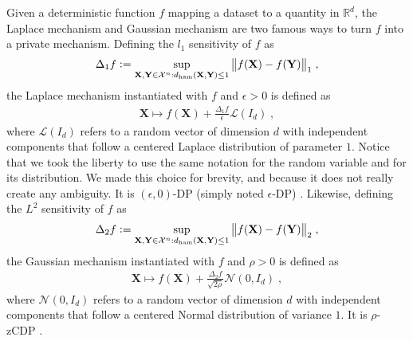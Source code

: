 \documentclass[10pt]{article} %
\newcommand{\R}[0]{\mathbb{R}}
\newcommand{\eqdef}{\vcentcolon=}
\newcommand\set[1]{\mathcal{#1}}
\newcommand\vect[1]{\mathbf{#1}}
\newcommand\ham[2]{d_\mathrm{ham}\left( {#1}, {#2} \right)}
\newcommand\AG[1]{\textcolor{magenta}{#1}}
\begin{document}
Given a deterministic function $f$ mapping a dataset to a quantity in $\R^d$, the Laplace mechanism \citep{dwork2006calibrating} and Gaussian mechanism \citep{bun2016concentrated} are two famous ways to turn $f$ into a private mechanism.
Defining the $l_1$ sensitivity of $f$ as
\begin{equation*}
\begin{aligned}
    \Delta_1 f \eqdef \sup_{\vect{X}, \vect{Y} \in \set{X}^n : \ham{\vect{X}}{\vect{Y}} \leq 1} \big\| f (\vect{X})  - f (\vect{Y})\big\|_1 \;,
\end{aligned}
\end{equation*}
the Laplace mechanism instantiated with $f$ and $\epsilon > 0$ is defined as
\begin{equation*}
    \begin{aligned}
        \vect{X} \mapsto f(\vect{X}) + \frac{\Delta_1 f}{\epsilon} \mathcal{L}(I_d) \;,
    \end{aligned}
\end{equation*}
where $\mathcal{L}(I_d)$ refers to a random vector of dimension $d$ with independent components that follow a centered Laplace distribution of parameter $1$. 
Notice that we took the liberty to use the same notation for the random variable and for its distribution. We made this choice for brevity, and because it does not really create any ambiguity.
It is $(\epsilon, 0)$-DP (simply noted $\epsilon$-DP) \citep{dwork2006our,dwork2006calibrating}.
Likewise, defining the $L^2$ sensitivity of $f$ as
\begin{equation*}
\begin{aligned}
    \Delta_2 f \eqdef \sup_{\vect{X}, \vect{Y} \in \set{X}^n : \ham{\vect{X}}{\vect{Y}} \leq 1} \big\| f (\vect{X})  - f (\vect{Y})\big\|_2 \;,
\end{aligned}
\end{equation*}
the Gaussian mechanism instantiated with $f$ and $\rho > 0$ is defined as
\begin{equation*}
    \begin{aligned}
        \vect{X} \mapsto f(\vect{X}) + \frac{\Delta_2 f}{\sqrt{2 \rho}} \mathcal{N}(0, I_d) \;,
    \end{aligned}
\end{equation*}
where $\mathcal{N}(0, I_d)$ refers to a random vector of dimension $d$ with independent components that follow a centered Normal distribution of variance $1$. It is $\rho$-zCDP \citep{bun2016concentrated}.
\end{document}
